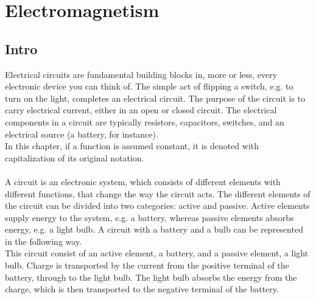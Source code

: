 \chapter{Electromagnetism}
\section{Intro}
Electrical circuits are fundamental building blocks in, more or less, every electronic device you can think of. The simple act of flipping a switch, e.g. to turn on the light, completes an electrical circuit. The purpose of the circuit is to carry electrical current, either in an open or closed circuit. The electrical components in a circuit are typically resistors, capacitors,  switches, and an electrical 	source (a battery, for instance).
\\ 
In this chapter, if a function is assumed constant, it is denoted with capitalization of its original notation. 
\\ 
\\
A circuit is an electronic system, which consists of different elements with different functions, that change the way the circuit acts. The different elements of the circuit can be divided into two categories: active and passive. Active elements supply energy to the system, e.g. a battery, whereas passive elements absorbs energy, e.g. a light bulb. A circuit with a battery and a bulb can be represented in the following way. 
\\ This circuit consist of an active element, a battery, and a passive element, a light bulb. Charge is transported by the current from the positive terminal of the battery, through to the light bulb. The light bulb absorbs the energy from the charge, which is then transported to the negative terminal of the battery.
\\
